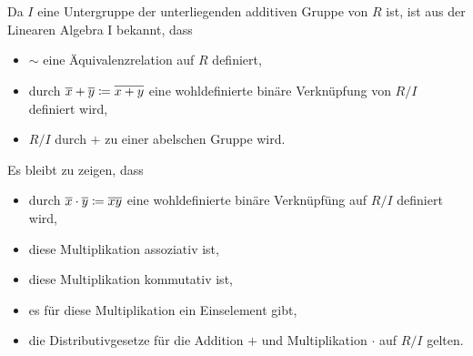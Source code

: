 \section{}





\subsection{}
Da $I$ eine Untergruppe der unterliegenden additiven Gruppe von $R$ ist, ist aus der Linearen Algebra I bekannt, dass
\begin{itemize}
  \item
    $\sim$ eine Äquivalenzrelation auf $R$ definiert,
  \item
    durch $\overline{x} + \overline{y} \coloneqq \overline{x+y}$ eine wohldefinierte binäre Verknüpfung von $R/I$ definiert wird,
  \item
    $R/I$ durch $+$ zu einer abelschen Gruppe wird.
\end{itemize}
Es bleibt zu zeigen, dass
\begin{itemize}
  \item
    durch $\overline{x} \cdot \overline{y} \coloneqq \overline{xy}$ eine wohldefinierte binäre Verknüpfüng auf $R/I$ definiert wird,
  \item
    diese Multiplikation assoziativ ist,
  \item
    diese Multiplikation kommutativ ist,
  \item
    es für diese Multiplikation ein Einselement gibt,
  \item
    die Distributivgesetze für die Addition $+$ und Multiplikation $\cdot$ auf $R/I$ gelten.
\end{itemize}

